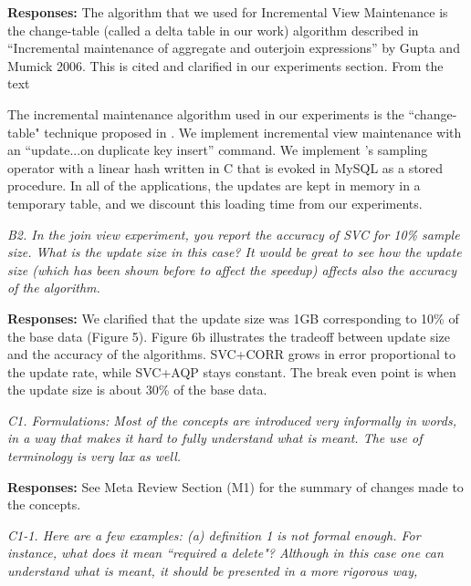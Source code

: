 \vspace{.25em}

{\bf Responses:} The algorithm that we used for Incremental View Maintenance is the change-table (called a delta table in our work) algorithm described in “Incremental maintenance of aggregate and outerjoin expressions” by Gupta and Mumick 2006. This is cited and clarified in our experiments section. From the text\begin{displayquote} 
The incremental maintenance algorithm used in our experiments is the ``change-table" technique proposed in \cite{gupta2006incremental}. We implement incremental view maintenance with an ``update...on duplicate key insert'' command. We implement \svc's sampling operator with a linear hash written in C that is evoked in MySQL as a stored procedure. In all of the applications, the updates are kept in memory in a temporary table, and we discount this loading time from our experiments.\end{displayquote} 


\vspace{1em}
\emph{B2. In the join view experiment, you report the accuracy of SVC for 10\% sample size. What is the update size in this case? It would be great to see how the update size (which has been shown before to affect the speedup) affects also the accuracy of the algorithm.}

\vspace{.25em}

{\bf Responses:} We clarified that the update size was 1GB corresponding to 10\% of the base data (Figure 5). Figure 6b illustrates the tradeoff between update size and the accuracy of the algorithms. SVC+CORR grows in error proportional to the update rate, while SVC+AQP stays constant. The break even point is when the update size is about 30\% of the base data. 

\vspace{1em}
\emph{C1. Formulations: Most of the concepts are introduced very informally in words, in a way that makes it hard to fully understand what is meant. The use of terminology is very lax as well. }

\vspace{.25em}

{\bf Responses:} See Meta Review Section (M1) for the summary of changes made to the concepts.

\vspace{1em}
\emph{C1-1. Here are a few examples: (a) definition 1 is not formal enough. For instance, what does it mean ``required a delete"? Although in this case one can understand what is meant, it should be presented in a more rigorous way,} 

